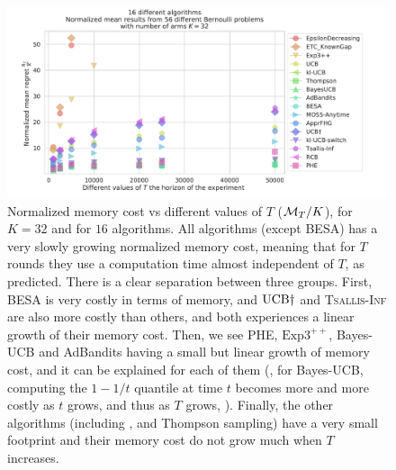 \begin{figure}[h!]  %
	\includegraphics[width=1.10\linewidth]{16_different_algorithms__normmemory_vs_horizons__56pb__K32_7Ts.pdf}
	\caption[Normalized memory cost vs different values of $T$.]{
        Normalized memory cost vs different values of $T$ ($\mathcal{M}_T / K$),
        for $K=32$ and for $16$ algorithms.
        All algorithms (except BESA) has a very slowly growing normalized memory cost, meaning that for $T$ rounds they use a computation time almost independent of $T$, as predicted.
        There is a clear separation between three groups.
        First, BESA is very costly in terms of memory, and $\mathrm{UCB}\dagger$ and \textsc{Tsallis-Inf} are also more costly than others, and both experiences a linear growth of their memory cost.
        Then, we see PHE, $\mathrm{Exp}3^{++}$, Bayes-UCB and AdBandits having a small but linear growth of memory cost, and it can be explained for each of them (\eg, for Bayes-UCB, computing the $1-1/t$ quantile at time $t$ becomes more and more costly as $t$ grows, and thus as $T$ grows,  ).
        Finally, the other algorithms (including \UCB, \klUCB{} and Thompson sampling) have a very small footprint and their memory cost do not grow much when $T$ increases.
	}
	\label{fig:3:16_different_algorithms__normmemory_vs_horizons__56pb__K32_7Ts}
\end{figure}


